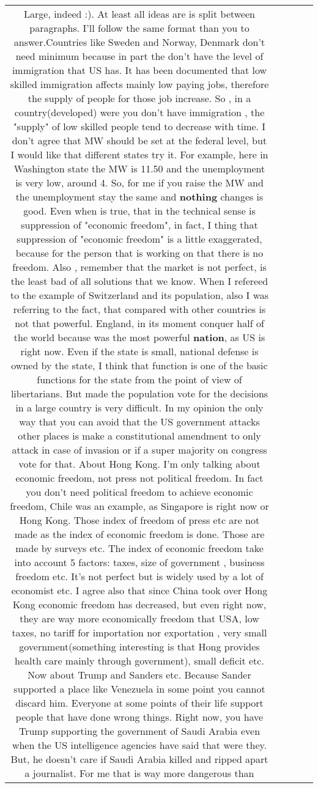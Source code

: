 \documentclass[11pt]{article}
\newlength\mylength
\begin{document}
\begin{center}
\begin{longtable}{|C{.65\mylength}|C{.30\mylength}|C{.12\mylength}|C{.12\mylength}|C{.12\mylength}|}
  \small Large, indeed :). At least all ideas are is split between paragraphs. I'll follow the same format than you to answer.Countries like  Sweden and Norway, Denmark don't need minimum because in part the don't have the level of immigration that US has. It has been documented that low skilled immigration affects mainly low paying jobs, therefore the supply of people for those job increase. So , in a country(developed) were you don't have immigration , the "supply" of low skilled people tend to decrease with time. I don't agree that MW should be set at the federal level, but I would like that different states try it. For example, here in Washington state the MW is 11.50 and the unemployment is very low, around 4. So, for me if you raise the MW and the unemployment stay the same and \textbf{nothing} changes is good. Even when is true, that in the technical sense is suppression of "economic freedom", in fact, I thing that suppression of "economic freedom" is a little exaggerated, because for the person that is working on that there is no freedom. Also , remember that the market is not perfect, is the least bad of all solutions that we know. When I refereed to the example of Switzerland  and its population, also I was referring to the fact, that compared with other countries is not that powerful. England, in its moment conquer half of the world because was the most powerful \textbf{nation}, as US is right now. Even if the state is small, national defense is owned by the state, I think that function is one of the basic functions for the state from the point of view of libertarians. But made the population vote for the decisions in a large country is very difficult. In my opinion the only way that you can avoid that the US government attacks other places is make a constitutional amendment to only attack in case of invasion or if a super majority on congress vote for that. About Hong Kong. I'm only talking about economic freedom, not press not political freedom. In fact you don't need political freedom to achieve economic freedom, Chile was an example, as Singapore is right now or Hong Kong. Those index of freedom of press etc are not made as the index of economic freedom is done. Those are made by surveys etc. The index of economic freedom take into account 5 factors: taxes, size of government , business freedom etc. It's not perfect but is widely used by a lot of economist etc. I agree also that since China took over Hong Kong economic freedom has decreased, but even right now, they are way more economically freedom that USA, low taxes, no tariff for importation nor exportation , very small government(something interesting is that Hong provides health care mainly through government), small deficit etc. Now about Trump and Sanders etc. Because Sander supported a place like Venezuela in some point you cannot discard him. Everyone at some points of their life support people that have done wrong things. Right now, you have Trump supporting the government of Saudi Arabia even when the US intelligence agencies have said that were they. But, he doesn't care if Saudi Arabia killed and ripped apart a journalist. For me that is way more dangerous than 
\end{longtable}
\end{center}
\end{document}
